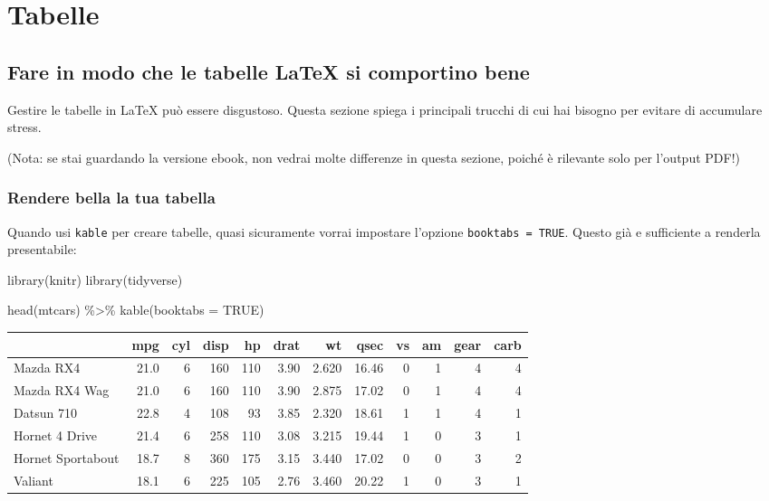 \documentclass[a4paper, 11pt, nobind]{templates/ociamthesis}
\newenvironment{Shaded}{\begin{snugshade}}{\end{snugshade}}
\newcommand{\AttributeTok}[1]{\textcolor[rgb]{0.77,0.63,0.00}{#1}}
\newcommand{\ConstantTok}[1]{\textcolor[rgb]{0.00,0.00,0.00}{#1}}
\newcommand{\FunctionTok}[1]{\textcolor[rgb]{0.00,0.00,0.00}{#1}}
\newcommand{\NormalTok}[1]{#1}
\newcommand{\SpecialCharTok}[1]{\textcolor[rgb]{0.00,0.00,0.00}{#1}}
\renewenvironment{Shaded}
{
  \vspace{10pt}%
  \begin{snugshade}%
}{%
  \end{snugshade}%
  \vspace{8pt}%
}
\begin{document}
\hypertarget{tables}{%
\chapter{Tabelle}\label{tables}}

\minitoc 

\hypertarget{fare-in-modo-che-le-tabelle-latex-si-comportino-bene}{%
\section{Fare in modo che le tabelle LaTeX si comportino bene}\label{fare-in-modo-che-le-tabelle-latex-si-comportino-bene}}

Gestire le tabelle in LaTeX può essere disgustoso.
Questa sezione spiega i principali trucchi di cui hai bisogno per evitare di accumulare stress.

(Nota: se stai guardando la versione ebook, non vedrai molte differenze in questa sezione, poiché è rilevante solo per l'output PDF!)

\hypertarget{rendere-bella-la-tua-tabella}{%
\subsection{Rendere bella la tua tabella}\label{rendere-bella-la-tua-tabella}}

Quando usi \texttt{kable} per creare tabelle, quasi sicuramente vorrai impostare l'opzione \texttt{booktabs\ =\ TRUE}.
Questo già e sufficiente a renderla presentabile:

\begin{Shaded}
\begin{Highlighting}[]
\FunctionTok{library}\NormalTok{(knitr)}
\FunctionTok{library}\NormalTok{(tidyverse)}

\FunctionTok{head}\NormalTok{(mtcars) }\SpecialCharTok{\%\textgreater{}\%} 
  \FunctionTok{kable}\NormalTok{(}\AttributeTok{booktabs =} \ConstantTok{TRUE}\NormalTok{)}
\end{Highlighting}
\end{Shaded}

\begin{tabular}{lrrrrrrrrrrr}
\toprule
  & mpg & cyl & disp & hp & drat & wt & qsec & vs & am & gear & carb\\
\midrule
Mazda RX4 & 21.0 & 6 & 160 & 110 & 3.90 & 2.620 & 16.46 & 0 & 1 & 4 & 4\\
Mazda RX4 Wag & 21.0 & 6 & 160 & 110 & 3.90 & 2.875 & 17.02 & 0 & 1 & 4 & 4\\
Datsun 710 & 22.8 & 4 & 108 & 93 & 3.85 & 2.320 & 18.61 & 1 & 1 & 4 & 1\\
Hornet 4 Drive & 21.4 & 6 & 258 & 110 & 3.08 & 3.215 & 19.44 & 1 & 0 & 3 & 1\\
Hornet Sportabout & 18.7 & 8 & 360 & 175 & 3.15 & 3.440 & 17.02 & 0 & 0 & 3 & 2\\
\addlinespace
Valiant & 18.1 & 6 & 225 & 105 & 2.76 & 3.460 & 20.22 & 1 & 0 & 3 & 1\\
\bottomrule
\end{tabular}
\end{document}
